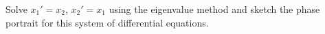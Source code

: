 \begin{exercise}\ansMark%
Solve $x_1' = x_2$, $x_2' = x_1$ using the eigenvalue method and sketch the phase portrait for this system of differential equations.
\end{exercise}



